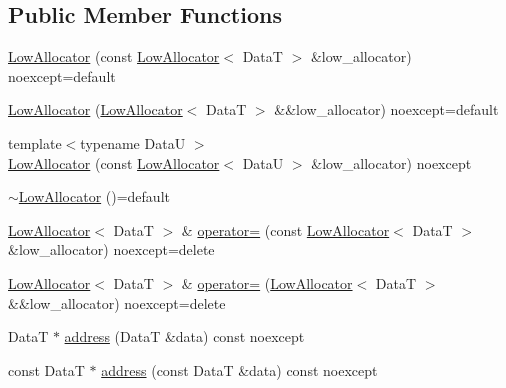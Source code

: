 \subsection*{Public Member Functions}
\begin{DoxyCompactItemize}
\item 
\hyperlink{structmage_1_1_double_ended_memory_stack_1_1_low_allocator_a42774d0cb98d56b88d3e7b511b03e120}{Low\+Allocator} (const \hyperlink{structmage_1_1_double_ended_memory_stack_1_1_low_allocator}{Low\+Allocator}$<$ DataT $>$ \&low\+\_\+allocator) noexcept=default
\item 
\hyperlink{structmage_1_1_double_ended_memory_stack_1_1_low_allocator_a72a6db54a792613d30eb5cf71ceed694}{Low\+Allocator} (\hyperlink{structmage_1_1_double_ended_memory_stack_1_1_low_allocator}{Low\+Allocator}$<$ DataT $>$ \&\&low\+\_\+allocator) noexcept=default
\item 
{\footnotesize template$<$typename DataU $>$ }\\\hyperlink{structmage_1_1_double_ended_memory_stack_1_1_low_allocator_a1faf25bcb1999a1f1f31dd0a9a32512e}{Low\+Allocator} (const \hyperlink{structmage_1_1_double_ended_memory_stack_1_1_low_allocator}{Low\+Allocator}$<$ DataU $>$ \&low\+\_\+allocator) noexcept
\item 
\hyperlink{structmage_1_1_double_ended_memory_stack_1_1_low_allocator_a27347818f8babe64abc64db773f655c0}{$\sim$\+Low\+Allocator} ()=default
\item 
\hyperlink{structmage_1_1_double_ended_memory_stack_1_1_low_allocator}{Low\+Allocator}$<$ DataT $>$ \& \hyperlink{structmage_1_1_double_ended_memory_stack_1_1_low_allocator_a504e64c7ed51a455635683346a22caf5}{operator=} (const \hyperlink{structmage_1_1_double_ended_memory_stack_1_1_low_allocator}{Low\+Allocator}$<$ DataT $>$ \&low\+\_\+allocator) noexcept=delete
\item 
\hyperlink{structmage_1_1_double_ended_memory_stack_1_1_low_allocator}{Low\+Allocator}$<$ DataT $>$ \& \hyperlink{structmage_1_1_double_ended_memory_stack_1_1_low_allocator_a41074a252b7ebdd542d4dd597c4ff172}{operator=} (\hyperlink{structmage_1_1_double_ended_memory_stack_1_1_low_allocator}{Low\+Allocator}$<$ DataT $>$ \&\&low\+\_\+allocator) noexcept=delete
\item 
DataT $\ast$ \hyperlink{structmage_1_1_double_ended_memory_stack_1_1_low_allocator_a5c8652dba997772c31e4d9fe3544d800}{address} (DataT \&data) const noexcept
\item 
const DataT $\ast$ \hyperlink{structmage_1_1_double_ended_memory_stack_1_1_low_allocator_a2534642d00a890a97b262c47388c2c60}{address} (const DataT \&data) const noexcept

\end{DoxyCompactItemize}
